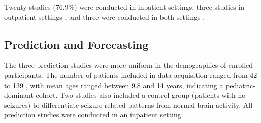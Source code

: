 Twenty studies (76.9\%) were conducted in inpatient settings, three studies in outpatient settings \cite{Chowdhury2022-bi,Wang2022-lt,Dong2022-oo}, and three were conducted in both settings \cite{Wang2025-my,Regalia2019-ch,Nasseri2021-xn}. 

\subsection{Prediction and Forecasting}
The three prediction studies were more uniform in the demographics of enrolled participants. The number of patients included in data acquisition ranged from 42 \cite{Vieluf2023-ta} to 139 \cite{Vieluf2023-zv}, with mean ages ranged between 9.8 \cite{Meisel2020-ii} and 14 \cite{Vieluf2023-ta} years, indicating a pediatric-dominant cohort. Two studies \cite{Vieluf2023-zv,Vieluf2023-ta} also included a control group (patients with no seizures) to differentiate seizure-related patterns from normal brain activity. All prediction studies were conducted in an inpatient setting.